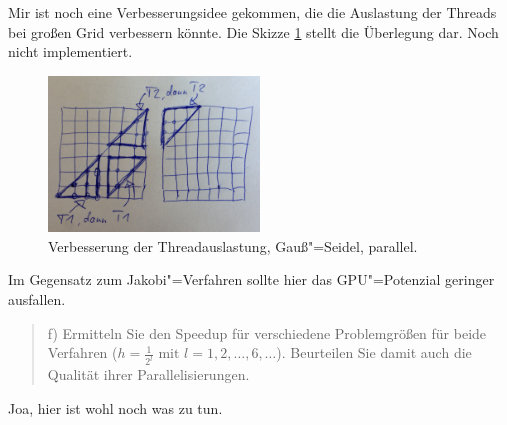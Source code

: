 \documentclass[paper = a4]{scrartcl}
\begin{document}
Mir ist noch eine Verbesserungsidee gekommen, die die Auslastung der Threads bei großen Grid verbessern könnte. Die Skizze \ref{fig:gaussseideldreiecke} stellt die Überlegung dar. Noch nicht implementiert.

\begin{figure}
    \centering
    \includegraphics[width=0.5\textwidth]{gaussseideldreiecke}
    \caption{Verbesserung der Threadauslastung, Gauß"=Seidel, parallel.}
    \label{fig:gaussseideldreiecke}
\end{figure}

Im Gegensatz zum Jakobi"=Verfahren sollte hier das GPU"=Potenzial geringer ausfallen.

\begin{quote}
    f) Ermitteln Sie den Speedup für verschiedene Problemgrößen für beide Verfahren (\(h = \frac{1}{2^l} \text{ mit } l = 1, 2, \dots, 6, \dots\)). Beurteilen Sie damit auch die Qualität ihrer Parallelisierungen.
\end{quote}

Joa, hier ist wohl noch was zu tun.
\end{document}
